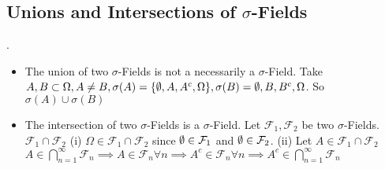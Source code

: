 \documentclass[class=article, crop=false]{standalone}
\begin{document}
\subsection{Unions and Intersections of $\sigma$-Fields}.
\begin{itemize}
	\item The union of two $\sigma$-Fields is not a necessarily a $\sigma$-Field. Take $A,B \subset \Omega, A \neq B, \sigma(A)=\{\emptyset,A,A^{c},\Omega\}, \sigma(B)={\emptyset,B,B^{c},\Omega}$. So 
			$\sigma(A) \cup \sigma(B)$ 
		\item The intersection of two $\sigma$-Fields is a $\sigma$-Field. Let $\mathcal{F}_1,\mathcal{F}_2$ be two $\sigma$-Fields. $\mathcal{F}_1 \cap \mathcal{F}_2$ 
			(i) $\Omega \in \mathcal{F}_1 \cap \mathcal{F}_2$ since $\emptyset \in \mathcal{F}_1$ and $\emptyset \in  \mathcal{F}_2$.
			(ii) Let $A \in \mathcal{F}_1 \cap \mathcal{F}_2$ 
			$A \in \bigcap_{n= 1}^{ \infty} \mathcal{F}_n \implies A \in \mathcal{F}_n \forall n \implies A^{c} \in \mathcal{F}_n \forall n \implies A^{c} \in \bigcap_{n= 1}^{ \infty} \mathcal{F}_n $
\end{itemize}
\end{document}
